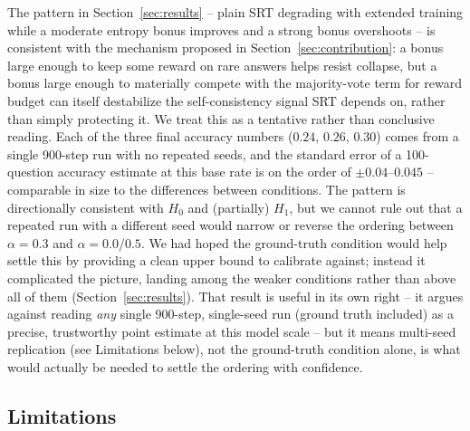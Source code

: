 \documentclass{article}
\begin{document}
The pattern in Section~\ref{sec:results} -- plain SRT degrading with
extended training while a moderate entropy bonus improves and a strong
bonus overshoots -- is consistent with the mechanism proposed in
Section~\ref{sec:contribution}: a bonus large enough to keep some reward on
rare answers helps resist collapse, but a bonus large enough to materially
compete with the majority-vote term for reward budget can itself destabilize
the self-consistency signal SRT depends on, rather than simply protecting
it. We treat this as a tentative rather than conclusive reading. Each of the
three final accuracy numbers ($0.24$, $0.26$, $0.30$) comes from a single
900-step run with no repeated seeds, and the standard error of a
100-question accuracy estimate at this base rate is on the order of
$\pm0.04$--$0.045$ -- comparable in size to the differences between
conditions. The pattern is directionally consistent with $H_0$ and
(partially) $H_1$, but we cannot rule out that a repeated run with a
different seed would narrow or reverse the ordering between $\alpha{=}0.3$
and $\alpha{=}0.0$/$0.5$. We had hoped the ground-truth condition would help
settle this by providing a clean upper bound to calibrate against; instead
it complicated the picture, landing among the weaker conditions rather than
above all of them (Section~\ref{sec:results}). That result is useful in its
own right -- it argues against reading \emph{any} single 900-step,
single-seed run (ground truth included) as a precise, trustworthy point estimate
at this model scale -- but it means multi-seed replication (see Limitations
below), not the ground-truth condition alone, is what would actually be needed to settle
the ordering with confidence.

\subsection{Limitations}
\end{document}
